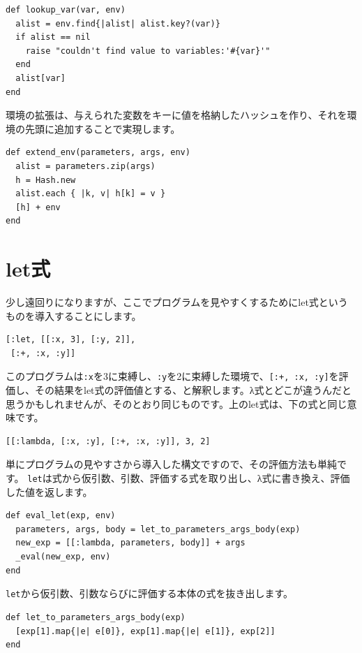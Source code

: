 \begin{lstlisting}
def lookup_var(var, env)
  alist = env.find{|alist| alist.key?(var)}
  if alist == nil
    raise "couldn't find value to variables:'#{var}'"
  end
  alist[var]
end  
\end{lstlisting}

環境の拡張は、与えられた変数をキーに値を格納したハッシュを作り、それを環境の先頭に追加することで実現します。

\begin{lstlisting}
def extend_env(parameters, args, env)
  alist = parameters.zip(args)
  h = Hash.new
  alist.each { |k, v| h[k] = v }
  [h] + env
end
\end{lstlisting}

\section{let式}

少し遠回りになりますが、ここでプログラムを見やすくするためにlet式というものを導入することにします。

\begin{lstlisting}
[:let, [[:x, 3], [:y, 2]],
 [:+, :x, :y]]
\end{lstlisting}

このプログラムは{\tt :x}を3に束縛し、{\tt :y}を2に束縛した環境で、{\tt [:+, :x, :y]}を評価し、その結果をlet式の評価値とする、と解釈します。λ式とどこが違うんだと思うかもしれませんが、そのとおり同じものです。上のlet式は、下の式と同じ意味です。

\begin{lstlisting}
[[:lambda, [:x, :y], [:+, :x, :y]], 3, 2]
\end{lstlisting}

単にプログラムの見やすさから導入した構文ですので、その評価方法も単純です。
{\tt let}は式から仮引数、引数、評価する式を取り出し、λ式に書き換え、評価した値を返します。

\begin{lstlisting}
def eval_let(exp, env)
  parameters, args, body = let_to_parameters_args_body(exp)
  new_exp = [[:lambda, parameters, body]] + args
  _eval(new_exp, env)
end
\end{lstlisting}

{\tt let}から仮引数、引数ならびに評価する本体の式を抜き出します。

\begin{lstlisting}
def let_to_parameters_args_body(exp)
  [exp[1].map{|e| e[0]}, exp[1].map{|e| e[1]}, exp[2]]
end
\end{lstlisting}

